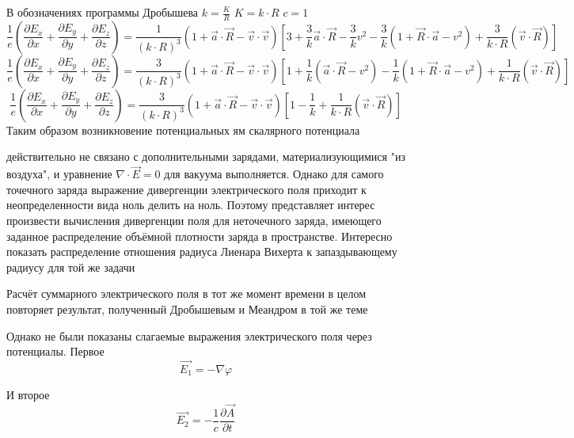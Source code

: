 \documentclass[11pt]{article}
\makeatletter
\newcommand{\boxspacing}{\kern\kvtcb@left@rule\kern\kvtcb@boxsep}
\newcommand{\prompt}[4]{
        {\ttfamily\llap{{\color{#2}[#3]:\hspace{3pt}#4}}\vspace{-\baselineskip}}
    }
\makeatother
\begin{document}
В обозначениях программы Дробышева \(k=\frac{K}{R}\) \(K=k\cdot R\)
\(c=1\)
\[\frac{1}{e}\left( \frac{\partial {{E}_{x}}}{\partial x}+\frac{\partial {{E}_{y}}}{\partial y}+\frac{\partial {{E}_{z}}}{\partial z} \right)=\frac{1}{{{\left( k\cdot R \right)}^{3}}}\left( 1+\overrightarrow{a}\cdot \overrightarrow{R}-\overrightarrow{v}\cdot \overrightarrow{v} \right)\left[ 3+\frac{3}{k}\overrightarrow{a}\cdot \overrightarrow{R}-\frac{3}{k}{{v}^{2}}-\frac{3}{k}\left( 1+\overrightarrow{R}\cdot \overrightarrow{a}-{{v}^{2}} \right)+\frac{3}{k\cdot R}\left( \overrightarrow{v}\cdot \overrightarrow{R} \right) \right]\]
\[\frac{1}{e}\left( \frac{\partial {{E}_{x}}}{\partial x}+\frac{\partial {{E}_{y}}}{\partial y}+\frac{\partial {{E}_{z}}}{\partial z} \right)=\frac{3}{{{\left( k\cdot R \right)}^{3}}}\left( 1+\overrightarrow{a}\cdot \overrightarrow{R}-\overrightarrow{v}\cdot \overrightarrow{v} \right)\left[ 1+\frac{1}{k}\left( \overrightarrow{a}\cdot \overrightarrow{R}-{{v}^{2}} \right)-\frac{1}{k}\left( 1+\overrightarrow{R}\cdot \overrightarrow{a}-{{v}^{2}} \right)+\frac{1}{k\cdot R}\left( \overrightarrow{v}\cdot \overrightarrow{R} \right) \right]\]
\[\frac{1}{e}\left( \frac{\partial {{E}_{x}}}{\partial x}+\frac{\partial {{E}_{y}}}{\partial y}+\frac{\partial {{E}_{z}}}{\partial z} \right)=\frac{3}{{{\left( k\cdot R \right)}^{3}}}\left( 1+\overrightarrow{a}\cdot \overrightarrow{R}-\overrightarrow{v}\cdot \overrightarrow{v} \right)\left[ 1-\frac{1}{k}+\frac{1}{k\cdot R}\left( \overrightarrow{v}\cdot \overrightarrow{R} \right) \right]\]
Таким образом возникновение потенциальных ям скалярного потенциала

действительно не связано с дополнительными зарядами, материализующимися
"из воздуха", и уравнение \(\nabla\cdot\vec{E}=0\) для вакуума
выполняется. Однако для самого точечного заряда выражение дивергенции
электрического поля приходит к неопределенности вида ноль делить на
ноль. Поэтому представляет интерес произвести вычисления дивергенции
поля для неточечного заряда, имеющего заданное распределение объёмной
плотности заряда в пространстве. Интересно показать распределение
отношения радиуса Лиенара Вихерта к запаздывающему радиусу для той же
задачи

Расчёт суммарного электрического поля в тот же момент времени в целом
повторяет результат, полученный Дробышевым и Меандром в той же теме

Однако не были показаны слагаемые выражения электрического поля через
потенциалы. Первое \[\overrightarrow{{{E}_{1}}}=-\nabla \varphi \]

И второе
\[\overrightarrow{{{E}_{2}}}=-\frac{1}{c}\frac{\partial \overrightarrow{A}}{\partial t}\]

    \begin{tcolorbox}[breakable, size=fbox, boxrule=1pt, pad at break*=1mm,colback=cellbackground, colframe=cellborder]
\prompt{In}{incolor}{ }{\boxspacing}
\begin{Verbatim}[commandchars=\\\{\}]

\end{Verbatim}
\end{tcolorbox}


\end{document}
